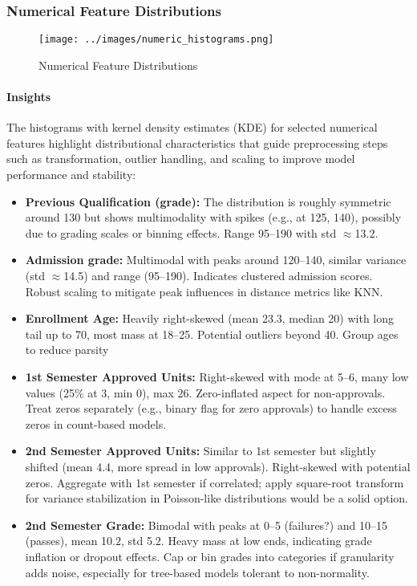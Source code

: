 \documentclass[twoside,final]{hcmut-report}
\begin{document}
\subsubsection{Numerical Feature Distributions}
\begin{figure}[H]
  \centering
  \texttt{[image: ../images/numeric\_histograms.png]}
  \caption{Numerical Feature Distributions}
  \label{num_dist_his}
\end{figure}

\paragraph*{Insights}

The histograms with kernel density estimates (KDE) for selected numerical features highlight distributional characteristics that guide preprocessing steps such as transformation, outlier handling, and scaling to improve model performance and stability:
\begin{itemize}
  \item \textbf{Previous Qualification (grade):} The distribution is roughly symmetric around 130 but shows multimodality with spikes (e.g., at 125, 140), possibly due to grading scales or binning effects. Range 95--190 with std $\approx$13.2.
  \item \textbf{Admission grade:} Multimodal with peaks around 120--140, similar variance (std $\approx$14.5) and range (95--190). Indicates clustered admission scores. Robust scaling to mitigate peak influences in distance metrics like KNN.
  \item \textbf{Enrollment Age:} Heavily right-skewed (mean 23.3, median 20) with long tail up to 70, most mass at 18--25. Potential outliers beyond 40. Group ages to reduce parsity
  \item \textbf{1st Semester Approved Units:} Right-skewed with mode at 5--6, many low values (25\% at 3, min 0), max 26. Zero-inflated aspect for non-approvals. Treat zeros separately (e.g., binary flag for zero approvals) to handle excess zeros in count-based models.
  \item \textbf{2nd Semester Approved Units:} Similar to 1st semester but slightly shifted (mean 4.4, more spread in low approvals). Right-skewed with potential zeros. Aggregate with 1st semester if correlated; apply square-root transform for variance stabilization in Poisson-like distributions would be a solid option.
  \item \textbf{2nd Semester Grade:} Bimodal with peaks at 0--5 (failures?) and 10--15 (passes), mean 10.2, std 5.2. Heavy mass at low ends, indicating grade inflation or dropout effects. Cap or bin grades into categories if granularity adds noise, especially for tree-based models tolerant to non-normality.
\end{itemize}
\end{document}
